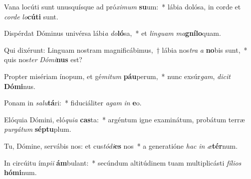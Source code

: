 \item Vana locúti sunt unusquísque ad pró\textit{xi}\textit{mum} \textbf{su}um:~* lábia dolósa, in corde et \textit{cor}\textit{de} \textit{lo}\textbf{cú}\textbf{ti} sunt.
\item Dispérdat Dóminus univérsa lábi\textit{a} \textit{do}\textbf{ló}sa,~* et \textit{lin}\textit{guam} \textit{ma}\textbf{gní}\textbf{lo}quam.
\item Qui dixérunt: Linguam nostram magnificábimus,~† lábia nos\textit{tra} \textit{a} \textbf{no}bis sunt,~* quis nos\textit{ter} \textit{Dó}\textit{mi}\textbf{nus} est?
\item Propter misériam ínopum, et gé\textit{mi}\textit{tum} \textbf{páu}perum,~* nunc exsúr\textit{gam}, \textit{di}\textit{cit} \textbf{Dó}\textbf{mi}nus.
\item Ponam in \textit{sa}\textit{lu}\textbf{tá}ri:~* fiduciáliter \textit{a}\textit{gam} \textit{in} \textbf{e}o.
\item Elóquia Dómini, eló\textit{qui}\textit{a} \textbf{cas}ta:~* argéntum igne examinátum, probátum terræ \textit{pur}\textit{gá}\textit{tum} \textbf{sép}\textbf{tu}plum.
\item Tu, Dómine, servábis nos: et cus\textit{tó}\textit{di}\textbf{es} nos~* a generatióne \textit{hac} \textit{in} \textit{æ}\textbf{tér}num.
\item In circúitu ím\textit{pi}\textit{i} \textbf{ám}bulant:~* secúndum altitúdinem tuam multiplicásti \textit{fí}\textit{li}\textit{os} \textbf{hó}\textbf{mi}num.

